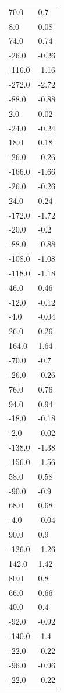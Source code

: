 \begin{longtable}{ll}
70.0 & 0.7 \\
8.0 & 0.08 \\
74.0 & 0.74 \\
-26.0 & -0.26 \\
-116.0 & -1.16 \\
-272.0 & -2.72 \\
-88.0 & -0.88 \\
2.0 & 0.02 \\
-24.0 & -0.24 \\
18.0 & 0.18 \\
-26.0 & -0.26 \\
-166.0 & -1.66 \\
-26.0 & -0.26 \\
24.0 & 0.24 \\
-172.0 & -1.72 \\
-20.0 & -0.2 \\
-88.0 & -0.88 \\
-108.0 & -1.08 \\
-118.0 & -1.18 \\
46.0 & 0.46 \\
-12.0 & -0.12 \\
-4.0 & -0.04 \\
26.0 & 0.26 \\
164.0 & 1.64 \\
-70.0 & -0.7 \\
-26.0 & -0.26 \\
76.0 & 0.76 \\
94.0 & 0.94 \\
-18.0 & -0.18 \\
-2.0 & -0.02 \\
-138.0 & -1.38 \\
-156.0 & -1.56 \\
58.0 & 0.58 \\
-90.0 & -0.9 \\
68.0 & 0.68 \\
-4.0 & -0.04 \\
90.0 & 0.9 \\
-126.0 & -1.26 \\
142.0 & 1.42 \\
80.0 & 0.8 \\
66.0 & 0.66 \\
40.0 & 0.4 \\
-92.0 & -0.92 \\
-140.0 & -1.4 \\
-22.0 & -0.22 \\
-96.0 & -0.96 \\
-22.0 & -0.22 \\

\end{longtable}

